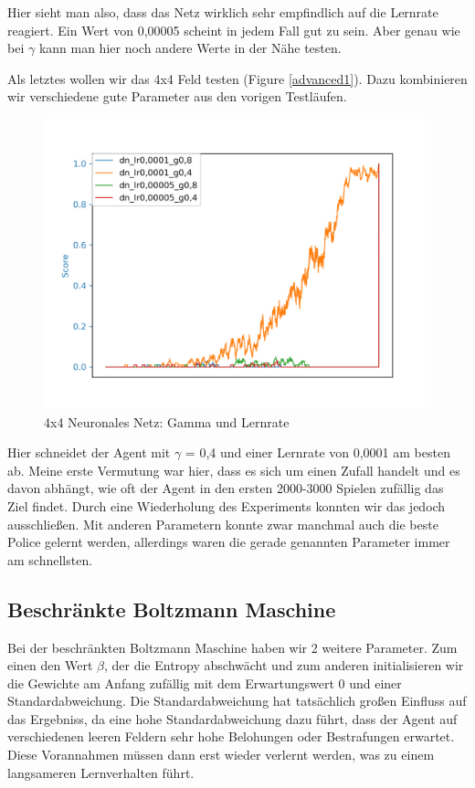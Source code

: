 Hier sieht man also, dass das Netz wirklich sehr empfindlich auf die Lernrate reagiert. Ein Wert von 0,00005 scheint in jedem Fall gut zu sein. Aber genau wie bei $\gamma$ kann man hier noch andere Werte in der Nähe testen.

Als letztes wollen wir das 4x4 Feld testen (Figure \ref{advanced1}). Dazu kombinieren wir verschiedene gute Parameter aus den vorigen Testläufen.

\begin{figure}[H]
\centering
\includegraphics[width=\textwidth]{Figures/4x4_16_dn_lr0,0001_g0,8_dn_lr0,0001_g0,4_dn_lr0,00005_g0,8_dn_lr0,00005_g0,4.png}
\caption{4x4 Neuronales Netz: Gamma und Lernrate}
\label{dn5}
\end{figure}

Hier schneidet der Agent mit $\gamma$ = 0,4 und einer Lernrate von 0,0001 am besten ab. Meine erste Vermutung war hier, dass es sich um einen Zufall handelt und es davon abhängt, wie oft der Agent in den ersten 2000-3000 Spielen zufällig das Ziel findet. Durch eine Wiederholung des Experiments konnten wir das jedoch ausschließen. Mit anderen Parametern konnte zwar manchmal auch die beste Police gelernt werden, allerdings waren die gerade genannten Parameter immer am schnellsten.

\subsection{Beschränkte Boltzmann Maschine}
\label{subsec:dbm_r}

Bei der beschränkten Boltzmann Maschine haben wir 2 weitere Parameter. Zum einen den Wert $\beta$, der die Entropy abschwächt und zum anderen initialisieren wir die Gewichte am Anfang zufällig mit dem Erwartungswert 0 und einer Standardabweichung. Die Standardabweichung hat tatsächlich großen Einfluss auf das Ergebniss, da eine hohe Standardabweichung dazu führt, dass der Agent auf verschiedenen leeren Feldern sehr hohe Belohungen oder Bestrafungen erwartet. Diese Vorannahmen müssen dann erst wieder verlernt werden, was zu einem langsameren Lernverhalten führt.

